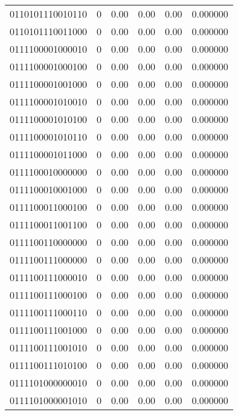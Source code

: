 \begin{tabular}{lrrrrr}
0110101110010110 &         0 &      0.00 &     0.00 &     0.00 &  0.000000 \\
0110101110011000 &         0 &      0.00 &     0.00 &     0.00 &  0.000000 \\
0111100001000010 &         0 &      0.00 &     0.00 &     0.00 &  0.000000 \\
0111100001000100 &         0 &      0.00 &     0.00 &     0.00 &  0.000000 \\
0111100001001000 &         0 &      0.00 &     0.00 &     0.00 &  0.000000 \\
0111100001010010 &         0 &      0.00 &     0.00 &     0.00 &  0.000000 \\
0111100001010100 &         0 &      0.00 &     0.00 &     0.00 &  0.000000 \\
0111100001010110 &         0 &      0.00 &     0.00 &     0.00 &  0.000000 \\
0111100001011000 &         0 &      0.00 &     0.00 &     0.00 &  0.000000 \\
0111100010000000 &         0 &      0.00 &     0.00 &     0.00 &  0.000000 \\
0111100010001000 &         0 &      0.00 &     0.00 &     0.00 &  0.000000 \\
0111100011000100 &         0 &      0.00 &     0.00 &     0.00 &  0.000000 \\
0111100011001100 &         0 &      0.00 &     0.00 &     0.00 &  0.000000 \\
0111100110000000 &         0 &      0.00 &     0.00 &     0.00 &  0.000000 \\
0111100111000000 &         0 &      0.00 &     0.00 &     0.00 &  0.000000 \\
0111100111000010 &         0 &      0.00 &     0.00 &     0.00 &  0.000000 \\
0111100111000100 &         0 &      0.00 &     0.00 &     0.00 &  0.000000 \\
0111100111000110 &         0 &      0.00 &     0.00 &     0.00 &  0.000000 \\
0111100111001000 &         0 &      0.00 &     0.00 &     0.00 &  0.000000 \\
0111100111001010 &         0 &      0.00 &     0.00 &     0.00 &  0.000000 \\
0111100111010100 &         0 &      0.00 &     0.00 &     0.00 &  0.000000 \\
0111101000000010 &         0 &      0.00 &     0.00 &     0.00 &  0.000000 \\
0111101000001010 &         0 &      0.00 &     0.00 &     0.00 &  0.000000 \\

\end{tabular}

